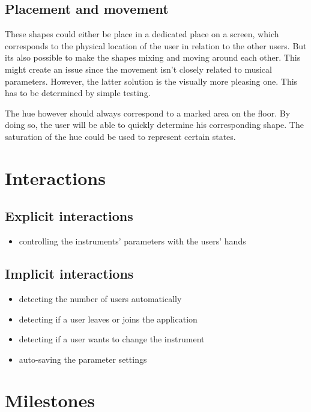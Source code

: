 \documentclass[titlepage, a4paper, 11pt]{scrartcl}
\begin{document}
\subsection{Placement and movement}

These shapes could either be place in a dedicated place on a screen, which corresponds to the physical location of the user in relation to the other users.
But its also possible to make the shapes mixing and moving around each other. This might create an issue since the movement isn't closely related to musical parameters.
However, the latter solution is the visually more pleasing one. This has to be determined by simple testing.

The hue however should always correspond to a marked area on the floor. By doing so, the user will be able to quickly determine his corresponding shape.
The saturation of the hue could be used to represent certain states.

\section{Interactions}

\subsection{Explicit interactions}

\begin{itemize}
    \item controlling the instruments' parameters with the users' hands
\end{itemize}

\subsection{Implicit interactions}

\begin{itemize}
    \item detecting the number of users automatically
    \item detecting if a user leaves or joins the application
    \item detecting if a user wants to change the instrument
    \item auto-saving the parameter settings
\end{itemize}

\section{Milestones}
\end{document}
